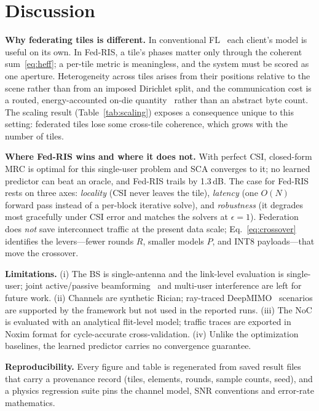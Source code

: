 \documentclass[conference]{IEEEtran}
\newcommand{\fedris}{Fed-RIS}
\newcommand{\dB}{\,dB\xspace}
\begin{document}
\section{Discussion}
\label{sec:discussion}

\textbf{Why federating tiles is different.} In conventional FL~\cite{mcmahan2017,kairouz2021} each client's model is useful on its own. In \fedris{}, a tile's phases matter only through the coherent sum~\eqref{eq:heff}; a per-tile metric is meaningless, and the system must be scored as one aperture. Heterogeneity across tiles arises from their positions relative to the scene rather than from an imposed Dirichlet split, and the communication cost is a routed, energy-accounted on-die quantity~\cite{dally2004,bjerregaard2006} rather than an abstract byte count. The scaling result (Table~\ref{tab:scaling}) exposes a consequence unique to this setting: federated tiles lose some cross-tile coherence, which grows with the number of tiles.

\textbf{Where \fedris{} wins and where it does not.} With perfect CSI, closed-form MRC is optimal for this single-user problem and SCA converges to it; no learned predictor can beat an oracle, and \fedris{} trails by 1.3\dB. The case for \fedris{} rests on three axes: \emph{locality} (CSI never leaves the tile), \emph{latency} (one $O(N)$ forward pass instead of a per-block iterative solve), and \emph{robustness} (it degrades most gracefully under CSI error and matches the solvers at $\epsilon=1$). Federation does \emph{not} save interconnect traffic at the present data scale; Eq.~\eqref{eq:crossover} identifies the levers---fewer rounds $R$, smaller models $P$, and INT8 payloads---that move the crossover.

\textbf{Limitations.} (i) The BS is single-antenna and the link-level evaluation is single-user; joint active/passive beamforming~\cite{wu2019joint} and multi-user interference are left for future work. (ii) Channels are synthetic Rician; ray-traced DeepMIMO~\cite{alkhateeb2019} scenarios are supported by the framework but not used in the reported runs. (iii) The NoC is evaluated with an analytical flit-level model; traffic traces are exported in Noxim format for cycle-accurate cross-validation. (iv) Unlike the optimization baselines, the learned predictor carries no convergence guarantee.

\textbf{Reproducibility.} Every figure and table is regenerated from saved result files that carry a provenance record (tiles, elements, rounds, sample counts, seed), and a physics regression suite pins the channel model, SNR conventions and error-rate mathematics.
\end{document}
